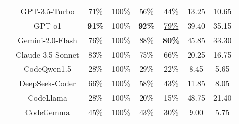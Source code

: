 \begin{table}[t]
{\begin{tabular}{cccccccc}
 & GPT-3.5-Turbo & 71\% & 100\% & 56\% & 44\% & 13.25 & 10.65 \\
 & GPT-o1 & \textbf{91\%} & 100\% & \textbf{92\%} & \underline{79\%} & 39.40 & 35.15 \\
 & Gemini-2.0-Flash & 76\% & 100\% & \underline{88\%} & \textbf{80\%} & 45.85 & 33.30 \\
 & Claude-3.5-Sonnet & 83\% & 100\% & 75\% & 66\% & 20.25 & 16.75 \\
 & CodeQwen1.5  & 28\% & 100\% & 29\% & 22\% & 8.45 & 5.65 \\
 & DeepSeek-Coder & 66\% & 100\% & 58\% & 43\% & 11.85 & 8.05 \\
 & CodeLlama & 28\% & 100\% & 20\% & 15\% & 48.75 & 21.40 \\
 & CodeGemma & 45\% & 100\% & 43\% & 30\% & 9.00 & 5.75 \\
 \hline
\end{tabular}
}
\label{tab: ablation2}
\end{table}
